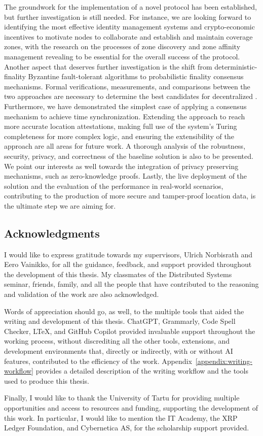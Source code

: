 The groundwork for the implementation of a novel \pol{} protocol has been established, but further investigation is still needed. For instance, we are looking forward to identifying the most effective identity management systems and crypto-economic incentives to motivate nodes to collaborate and establish and maintain coverage zones, with the research on the processes of zone discovery and zone affinity management revealing to be essential for the overall success of the protocol. Another aspect that deserves further investigation is the shift from deterministic-finality Byzantine fault-tolerant algorithms to probabilistic finality consensus mechanisms. Formal verifications, measurements, and comparisons between the two approaches are necessary to determine the best candidates for decentralized \pol{}. Furthermore, we have demonstrated the simplest case of applying a consensus mechanism to achieve time synchronization. Extending the approach to reach more accurate location attestations, making full use of the system's Turing completeness for more complex logic, and ensuring the extensibility of the approach are all areas for future work. A thorough analysis of the robustness, security, privacy, and correctness of the baseline solution is also to be presented. We point our interests as well towards the integration of privacy preserving mechanisms, such as zero-knowledge proofs. Lastly, the live deployment of the solution and the evaluation of the performance in real-world scenarios, contributing to the production of more secure and tamper-proof location data, is the ultimate step we are aiming for.

\subsection*{Acknowledgments}

I would like to express gratitude towards my supervisors, Ulrich Norbisrath and Eero Vainikko, for all the guidance, feedback, and support provided throughout the development of this thesis. My classmates of the Distributed Systems seminar, friends, family, and all the people that have contributed to the reasoning and validation of the work are also acknowledged.

Words of appreciation should go, as well, to the multiple tools that aided the writing and development of this thesis. ChatGPT, Grammarly, Code Spell Checker, LTeX, and GitHub Copilot provided invaluable support throughout the working process, without discrediting all the other tools, extensions, and development environments that, directly or indirectly, with or without AI features, contributed to the efficiency of the work. Appendix~\ref{appendix:writing-workflow} provides a detailed description of the writing workflow and the tools used to produce this thesis.

Finally, I would like to thank the University of Tartu for providing multiple opportunities and access to resources and funding, supporting the development of this work. In particular, I would like to mention the IT Academy, the XRP Ledger Foundation, and Cybernetica AS, for the scholarship support provided.